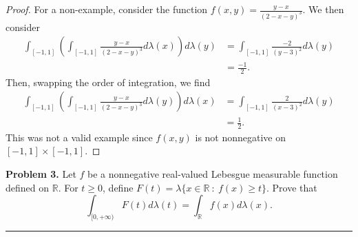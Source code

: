 \documentclass[leqno]{article}
\theoremstyle{nonumberplain}
\newtheorem{proof}{Proof}
\newcommand{\R}{\mathbb{R}}
\begin{document}
\begin{proof}
For a non-example, consider the function $f(x,y)=\frac{y-x}{(2-x-y)^3}$.  We then consider
\begin{align*}
\int_{[-1,1]} \left( \int_{[-1,1]} \frac{y-x}{(2-x-y)^3} d\lambda(x)\right) d\lambda(y)& = \int_{[-1,1]} \frac{-2}{(y-3)^2} d \lambda(y)\\
&= \frac{-1}{2}.
\end{align*}
Then, swapping the order of integration, we find
\begin{align*}
\int_{[-1,1]} \left( \int_{[-1,1]} \frac{y-x}{(2-x-y)^3} d\lambda(y)\right) d\lambda(x)& = \int_{[-1,1]} \frac{2}{(x-3)^2} d \lambda(y)\\
&= \frac{1}{2}.
\end{align*}
This was not a valid example since $f(x,y)$ is not nonnegative on $[-1,1]\times [-1,1]$.
\end{proof}


\pagebreak


\noindent\textbf{Problem 3.} \quad
Let $f$ be a nonnegative real-valued Lebesgue measurable function defined on $\R$. For $t\geq 0$, define $F(t)=\lambda \{x\in \R ~\colon~ f(x)\geq t\}$. Prove that
\[
\int_{[0,+\infty)}F(t)d\lambda(t) = \int_\R f(x)d\lambda (x).
\]

\noindent\rule[0.5ex]{\linewidth}{1pt}
\end{document}
